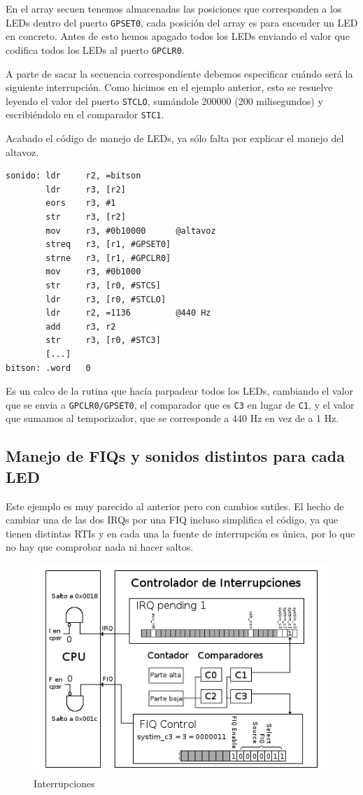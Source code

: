 En el array secuen tenemos almacenadas las posiciones que corresponden a los LEDs dentro del
puerto {\tt GPSET0}, cada posición del array es para encender un LED en concreto. Antes
de esto hemos apagado todos los LEDs enviando el valor que codifica todos los LEDs al
puerto {\tt GPCLR0}.

A parte de sacar la secuencia correspondiente debemos especificar cuándo será la siguiente
interrupción. Como hicimos en el ejemplo anterior, esto se resuelve leyendo el valor del
puerto {\tt STCLO}, sumándole 200000 (200 milisegundos) y escribiéndolo en el comparador
{\tt STC1}.

Acabado el código de manejo de LEDs, ya sólo falta por explicar el manejo del altavoz.

\begin{lstlisting}
sonido: ldr     r2, =bitson
        ldr     r3, [r2]
        eors    r3, #1
        str     r3, [r2]
        mov     r3, #0b10000      @altavoz
        streq   r3, [r1, #GPSET0]
        strne   r3, [r1, #GPCLR0]
        mov     r3, #0b1000
        str     r3, [r0, #STCS]
        ldr     r3, [r0, #STCLO]
        ldr     r2, =1136         @440 Hz
        add     r3, r2
        str     r3, [r0, #STC3]
        [...]
bitson: .word   0
\end{lstlisting}

Es un calco de la rutina que hacía parpadear todos los LEDs, cambiando
el valor que se envia a {\tt GPCLR0/GPSET0}, el comparador que es {\tt C3} en lugar de {\tt C1},
y el valor que sumamos al temporizador, que se corresponde a 440 Hz en vez de a 1 Hz.

\subsection{Manejo de FIQs y sonidos distintos para cada LED}

Este ejemplo es muy parecido al anterior pero con cambios sutiles. El hecho de cambiar una de
las dos IRQs por una FIQ incluso simplifica el código, ya que tienen distintas RTIs y en cada
una la fuente de interrupción es única, por lo que no hay que comprobar nada ni hacer saltos.

\begin{figure}[h]
  \centering
    \includegraphics[width=14cm]{graphs/inter5.png}
  \caption{Interrupciones}
  \label{fig:inter5}
\end{figure}

